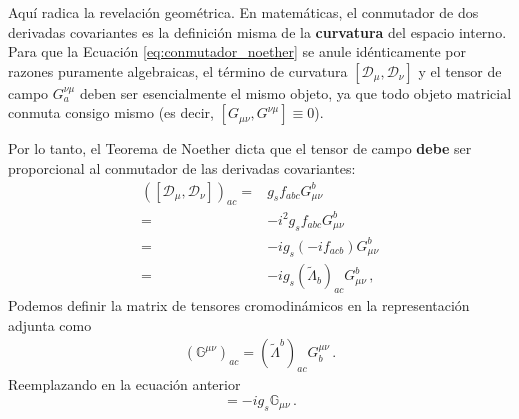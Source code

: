 Aquí radica la revelación geométrica. En matemáticas, el conmutador de dos derivadas covariantes es la definición misma de la \textbf{curvatura} del espacio interno. Para que la Ecuación \eqref{eq:conmutador_noether} se anule idénticamente por razones puramente algebraicas, el término de curvatura $[\mathcal{D}_\mu, \mathcal{D}_\nu]$ y el tensor de campo $G^{\nu\mu}_a$ deben ser esencialmente el mismo objeto, ya que todo objeto matricial conmuta consigo mismo (es decir, $[G_{\mu\nu}, G^{\nu\mu}] \equiv 0$).

Por lo tanto, el Teorema de Noether dicta que el tensor de campo \textbf{debe} ser proporcional al conmutador de las derivadas covariantes:
\begin{align}
  \left(  \left[\mathcal{D}_\mu, \mathcal{D}_\nu\right]\right)_{ac} =& g_s f_{abc} G_{\mu\nu}^b \nonumber\\
  =& - i^{2}g_s f_{abc} G_{\mu\nu}^b \nonumber\\
  =& -ig_s\left(-i f_{acb} \right)G_{\mu\nu}^b \nonumber\\
     =& -ig_s\left(\widetilde{\Lambda}_{b} \right)_{ac}G_{\mu\nu}^b \,,
\end{align}
Podemos definir la matrix de tensores cromodinámicos en la representación adjunta como
\begin{align}
  \left(\mathbb{G}^{\mu\nu}  \right)_{ac}
   = \left(\widetilde{\Lambda}^{b} \right)_{ac}G^{\mu\nu}_{b}\,.
\end{align}
Reemplazando en la ecuación anterior
\begin{equation}
 [\mathcal{D}_\mu, \mathcal{D}_\nu] =  - i g_{s}    \mathbb{G}_{\mu\nu}\,. 
\end{equation}

